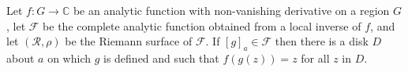 Let $f: G \to \mathbb{C}$ be an analytic function with non-vanishing derivative on a region $G$, let $\mathcal{F}$ be the complete analytic function obtained from a local inverse of $f$, and let $(\mathcal{R}, \rho)$ be the Riemann surface of $\mathcal{F}$. If $[g]_a \in \mathcal{F}$ then there is a disk $D$ about $a$ on which $g$ is defined and such that $f(g(z)) = z$ for all $z$ in $D$.

